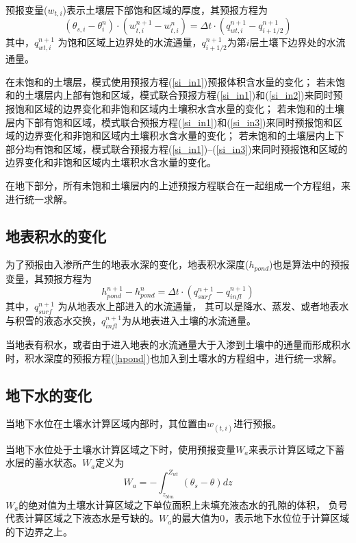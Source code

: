 预报变量($w_{t,i}$)表示土壤层下部饱和区域的厚度，其预报方程为
\begin{equation}\label{si_in3}
\left(\theta_{s, i}-\theta_{i}^{n}\right) \cdot\left(w_{t, i}^{n+1}-w_{t, i}^{n}\right)=\Delta t \cdot\left(q_{w t, i}^{n+1}-q_{i+1 / 2}^{n+1}\right)
\end{equation}
其中，$q_{wt,i}^{n+1}$  为饱和区域上边界处的水流通量，$q_{i+1/2}^{n+1}$为第$i$层土壤下边界处的水流通量。


在未饱和的土壤层，模式使用预报方程(\ref{si_in1})预报体积含水量的变化；
若未饱和的土壤层内上部有饱和区域，模式联合预报方程(\ref{si_in1})和(\ref{si_in2})来同时预报饱和区域的边界变化和非饱和区域内土壤积水含水量的变化；
若未饱和的土壤层内下部有饱和区域，模式联合预报方程(\ref{si_in1})和(\ref{si_in3})来同时预报饱和区域的边界变化和非饱和区域内土壤积水含水量的变化；
若未饱和的土壤层内上下部分均有饱和区域，模式联合预报方程(\ref{si_in1})--(\ref{si_in3})来同时预报饱和区域的边界变化和非饱和区域内土壤积水含水量的变化。


在地下部分，所有未饱和土壤层内的上述预报方程联合在一起组成一个方程组，来进行统一求解。

\subsection{地表积水的变化}
为了预报由入渗所产生的地表水深的变化，地表积水深度($h_{pond}$)也是算法中的预报变量，其预报方程为
\begin{equation}\label{hpond}
h_{ {pond }}^{n+1}-h_{ {pond }}^{n}=\Delta t \cdot\left(q_{ {surf }}^{n+1}-q_{ {infl }}^{n+1}\right)
\end{equation}
其中，$q_{surf}^{n+1} $ 为从地表水上部进入的水流通量，
其可以是降水、蒸发、或者地表水与积雪的液态水交换，$q_{infl}^{n+1}$为从地表进入土壤的水流通量。


当地表有积水，或者由于进入地表的水流通量大于入渗到土壤中的通量而形成积水时，积水深度的预报方程(\ref{hpond})也加入到土壤水的方程组中，进行统一求解。


\subsection{地下水的变化}
当地下水位在土壤水计算区域内部时，其位置由$w_{(t,i)}$进行预报。


当地下水位处于土壤水计算区域之下时，使用预报变量$W_a$来表示计算区域之下蓄水层的蓄水状态。$W_a$定义为
\begin{equation}
W_{a}=-\int_{z_{b t m}}^{Z_{w t}}\left(\theta_{s}-\theta\right) d z
\end{equation}
$W_a$的绝对值为土壤水计算区域之下单位面积上未填充液态水的孔隙的体积，
负号代表计算区域之下液态水是亏缺的。$W_a$的最大值为0，表示地下水位位于计算区域的下边界之上。


